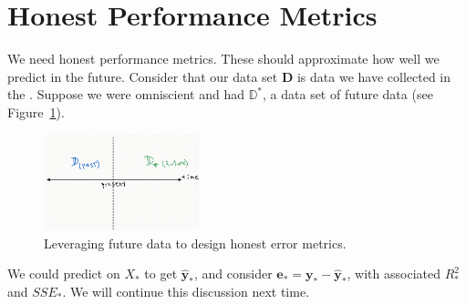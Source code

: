 \documentclass[12pt, a4paper]{article}
\theoremstyle{definition}
\begin{document}
	\section*{Honest Performance Metrics}
	We need honest performance metrics. These should approximate how well we predict
	in the future. Consider that our data set $\mathbf{D}$ is data we have collected
	in the . Suppose we were omniscient and had $\mathbb{D}^*$, a data
	set of future data (see Figure~\ref{fig:future-data}).
	\begin{figure}
		\centering
		\includegraphics[width=0.4\textwidth]{future-data}
		\caption{Leveraging future data to design honest error metrics.}
		\label{fig:future-data}
	\end{figure}
	We could predict on $X_*$ to get $\mathbf{\hat{y}}_*$, and consider
	$\mathbf{e}_*=\mathbf{y}_*-\mathbf{\hat{y}_*}$, with associated $R_*^2$ and $SSE_*$.
	We will continue this discussion next time.
	\pagebreak
	\printbibliography
\end{document}
